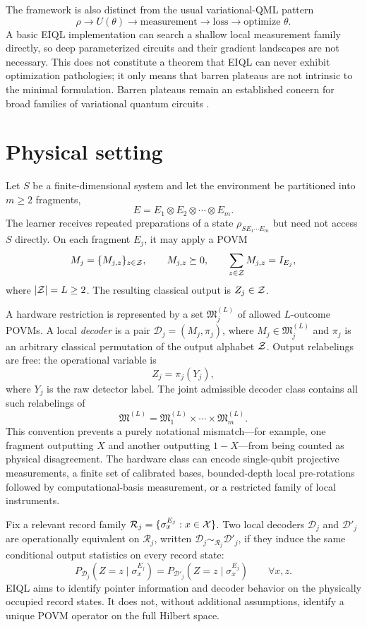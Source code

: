 The framework is also distinct from the usual variational-QML pattern
\[
\rho \longrightarrow U(\theta) \longrightarrow \text{measurement} \longrightarrow \text{loss} \longrightarrow \text{optimize }\theta.
\]
A basic EIQL implementation can search a shallow local measurement family directly, so deep parameterized circuits and their gradient landscapes are not necessary. This does not constitute a theorem that EIQL can never exhibit optimization pathologies; it only means that barren plateaus are not intrinsic to the minimal formulation. Barren plateaus remain an established concern for broad families of variational quantum circuits \cite{mcclean2018,larocca2024}.

\section{Physical setting}

Let $S$ be a finite-dimensional system and let the environment be partitioned into $m\ge 2$ fragments,
\[
E = E_1\otimes E_2\otimes\cdots\otimes E_m.
\]
The learner receives repeated preparations of a state $\rho_{SE_1\cdots E_m}$ but need not access $S$ directly. On each fragment $E_j$, it may apply a POVM
\[
M_j=\{M_{j,z}\}_{z\in\mathcal{Z}},\qquad M_{j,z}\succeq 0,\qquad \sum_{z\in\mathcal{Z}}M_{j,z}=I_{E_j},
\]
where $|\mathcal{Z}|=L\ge 2$. The resulting classical output is $Z_j\in\mathcal{Z}$.

A hardware restriction is represented by a set $\mathfrak M_j^{(L)}$ of allowed $L$-outcome POVMs. A local \emph{decoder} is a pair $\mathcal D_j=(M_j,\pi_j)$, where $M_j\in\mathfrak M_j^{(L)}$ and $\pi_j$ is an arbitrary classical permutation of the output alphabet $\mathcal{Z}$. Output relabelings are free: the operational variable is
\[
Z_j=\pi_j(Y_j),
\]
where $Y_j$ is the raw detector label. The joint admissible decoder class contains all such relabelings of
\[
\mathfrak M^{(L)}=\mathfrak M_1^{(L)}\times\cdots\times\mathfrak M_m^{(L)}.
\]
This convention prevents a purely notational mismatch---for example, one fragment outputting $X$ and another outputting $1-X$---from being counted as physical disagreement. The hardware class can encode single-qubit projective measurements, a finite set of calibrated bases, bounded-depth local pre-rotations followed by computational-basis measurement, or a restricted family of local instruments.

\begin{definition}
Fix a relevant record family $\mathcal R_j=\{\sigma_x^{E_j}:x\in\mathcal{X}\}$. Two local decoders $\mathcal D_j$ and $\mathcal D'_j$ are operationally equivalent on $\mathcal R_j$, written $\mathcal D_j\sim_{\mathcal R_j}\mathcal D'_j$, if they induce the same conditional output statistics on every record state:
\[
P_{\mathcal D_j}(Z=z\mid\sigma_x^{E_j})=P_{\mathcal D'_j}(Z=z\mid\sigma_x^{E_j})
\qquad\forall x,z.
\]
EIQL aims to identify pointer information and decoder behavior on the physically occupied record states. It does not, without additional assumptions, identify a unique POVM operator on the full Hilbert space.
\end{definition}

